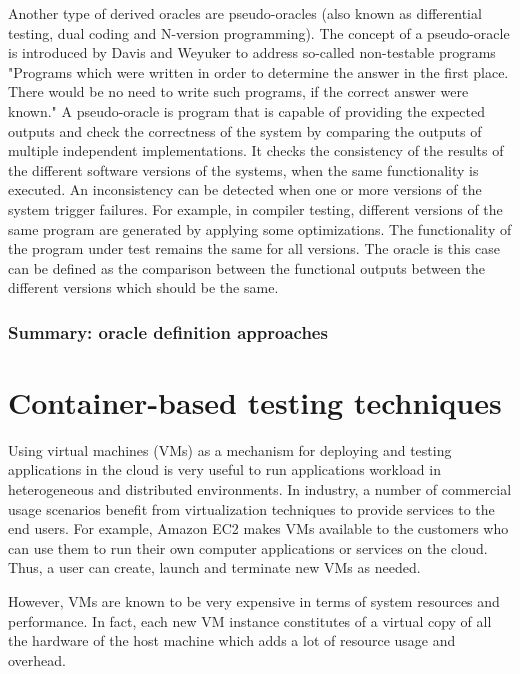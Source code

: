\begin{itemize}
Another type of derived oracles are pseudo-oracles (also known as differential testing, dual coding and N-version programming). 
The concept of a pseudo-oracle is introduced by Davis and Weyuker\cite{davis1981pseudo} to address so-called non-testable programs "Programs which were written in order to determine the answer in the first place. There would be no need to write such programs, if the correct answer were known."
A pseudo-oracle is program that is capable of providing the expected outputs and check the correctness of the system by comparing the outputs of multiple independent implementations. 
It checks the consistency of the results of the different software versions of the systems, when the same functionality is executed. An inconsistency can be detected when one or more versions of the system trigger failures. 
For example, in compiler testing, different versions of the same program are generated by applying some optimizations. The functionality of the program under test remains the same for all versions. The oracle is this case can be defined as the comparison between the functional outputs between the different versions which should be the same\cite{yang2011finding}.


\end{itemize}


\subsubsection{Summary: oracle definition approaches}

\section{Container-based testing techniques}

Using virtual machines (VMs) as a mechanism for deploying and testing applications in the cloud is very useful to run applications workload in heterogeneous and distributed environments.
In industry, a number of commercial usage scenarios benefit from virtualization techniques to provide services to the end users. For example, Amazon EC2 makes VMs available to the customers who can use them to run their own computer applications or services on the cloud. Thus, a user can create, launch and terminate new VMs as needed.  

However, VMs are known to be very expensive in terms of system resources and performance. In fact, each new VM instance constitutes of a virtual copy of all the hardware of the host machine which adds a lot of resource usage and overhead\cite{merkel2014docker}. 

